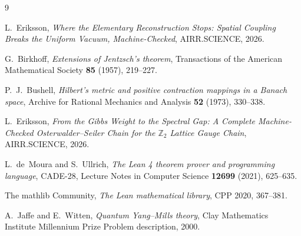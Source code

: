 \documentclass[11pt]{article}
\theoremstyle{definition}
\newcommand{\Z}{\mathbb{Z}}
\begin{document}
\begin{thebibliography}{9}

L.~Eriksson,
\emph{Where the Elementary Reconstruction Stops: Spatial Coupling Breaks the
Uniform Vacuum, Machine-Checked}, AIRR.SCIENCE, 2026.

G.~Birkhoff,
\emph{Extensions of Jentzsch's theorem},
Transactions of the American Mathematical Society \textbf{85} (1957), 219--227.

P.~J.~Bushell,
\emph{Hilbert's metric and positive contraction mappings in a Banach space},
Archive for Rational Mechanics and Analysis \textbf{52} (1973), 330--338.

L.~Eriksson,
\emph{From the Gibbs Weight to the Spectral Gap: A Complete Machine-Checked
Osterwalder--Seiler Chain for the $\Z_2$ Lattice Gauge Chain}, AIRR.SCIENCE, 2026.

L.~de~Moura and S.~Ullrich,
\emph{The Lean 4 theorem prover and programming language},
CADE-28, Lecture Notes in Computer Science \textbf{12699} (2021), 625--635.

The mathlib Community,
\emph{The Lean mathematical library},
CPP 2020, 367--381.

A.~Jaffe and E.~Witten,
\emph{Quantum Yang--Mills theory},
Clay Mathematics Institute Millennium Prize Problem description, 2000.

\end{thebibliography}
\end{document}
